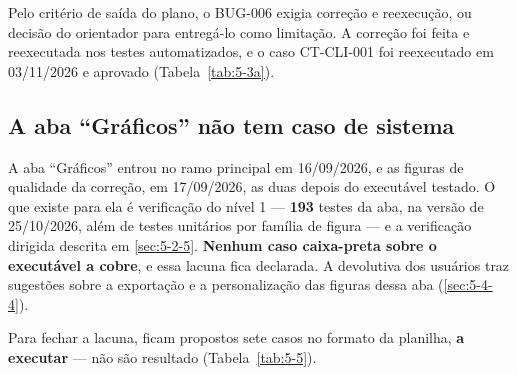 Pelo critério de saída do plano, o BUG-006 exigia correção e reexecução, ou decisão do orientador para entregá-lo como limitação. A correção foi feita e reexecutada nos testes automatizados, e o caso CT-CLI-001 foi reexecutado em 03/11/2026 e aprovado (Tabela~\ref{tab:5-3a}).


\subsection{A aba ``Gráficos'' não tem caso de sistema}\label{sec:5-2-4}

A aba ``Gráficos'' entrou no ramo principal em 16/09/2026, e as figuras de qualidade da correção, em 17/09/2026, as duas depois do executável testado. O que existe para ela é verificação do nível 1 --- \textbf{193} testes da aba, na versão de 25/10/2026, além de testes unitários por família de figura --- e a verificação dirigida descrita em \ref{sec:5-2-5}. \textbf{Nenhum caso caixa-preta sobre o executável a cobre}, e essa lacuna fica declarada. A devolutiva dos usuários traz sugestões sobre a exportação e a personalização das figuras dessa aba (\ref{sec:5-4-4}).


Para fechar a lacuna, ficam propostos sete casos no formato da planilha, \textbf{a executar} --- não são resultado (Tabela~\ref{tab:5-5}).


